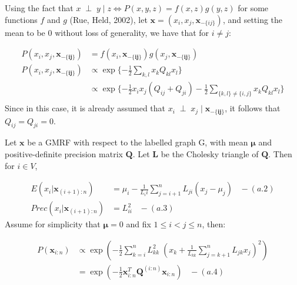 \documentclass[]{article}
\begin{document}
\vspace{1.0cm}

 \newline 

Using the fact that
\(x \; \perp \; y \;|\; z \iff P(x,y,z) = f(x,z) g(y,z)\) for some
functions \(f\) and \(g\) (Rue, Held, 2002), let
\(\mathbf{x} = (x_i, x_j, \mathbf{x}_{-\{ij\}})\), and setting the mean
to be 0 without loss of generality, we have that for \(i \neq j\):

\[
\begin{aligned}
P(x_i, x_j, \mathbf{x_{-\{ij\}}}) &= f(x_i, \mathbf{x_{-\{ij\}}}) g(x_j,\mathbf{x_{-\{ij\}}})\\
P(x_i, x_j, \mathbf{x_{-\{ij\}}}) &\propto \exp\{-\frac{1}{2} \sum_{k,l} x_k Q_{kl} x_l\} \\
&\propto \exp\{-\frac{1}{2}x_i x_j (Q_{ij} + Q_{ji}) -\frac{1}{2}\sum_{\{k,l\} \neq \{i,j\}} x_k Q_{kl} x_l\} \\
\end{aligned}
\] Since in this case, it is already assumed that
\(x_i \; \perp \; x_j \;|\; \mathbf{x_{-\{ij\}}}\), it follows that
\(Q_{ij} = Q_{ji} = 0\). \newline \newline \newline

 \newline 

Let \(\boldsymbol{x}\) be a GMRF with respect to the labelled graph G,
with mean \(\boldsymbol{\mu}\) and positive-definite precision matrix
\(\boldsymbol{Q}\). Let \(\boldsymbol{L}\) be the Cholesky triangle of
\(\boldsymbol{Q}\). Then for \(i \in V\),

\[
\begin{aligned}
E(x_i | \boldsymbol{x}_{(i+1):n}) &= \mu_i − \frac{1}{L_ii} \sum_{j=i+1}^n L_{ji}(x_j − \mu_j) \;\;\; - (a.2)\\ 
Prec(x_i | \boldsymbol{x}_{(i+1):n}) &= L^2_{ii} \;\;\; - (a.3)
\end{aligned}
\] Assume for simplicity that \(\boldsymbol{\mu} = 0\) and fix
\(1 \leq i < j \leq n\), then:

\[
\begin{aligned}
P(\boldsymbol{x}_{i:n}) &\propto \exp \left( -\frac{1}{2} \sum_{k=i}^n L_{kk}^2 \; \left(x_k + \frac{1}{L_{kk}} \sum_{j = k+1}^n L_{jk} x_j\right)^2 \right) \\
&= \exp \left(-\frac{1}{2}\boldsymbol{x}_{i:n}^T \boldsymbol{Q}^{(i:n)} \boldsymbol{x}_{i:n} \right) \;\;\; - (a.4)
\end{aligned}
\]
\end{document}
